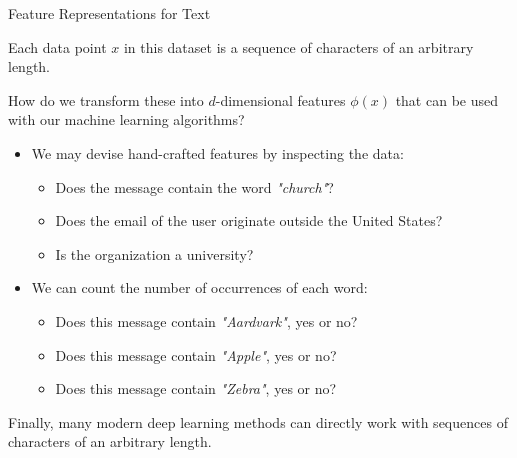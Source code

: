 \documentclass[../../main.tex]{subfiles}
\begin{document}
\begin{frame}[fragile]{Feature Representations for Text}


Each data point $x$ in this dataset is a sequence of characters of an arbitrary length.
\vspace{0.2cm}

How do we transform these into $d$-dimensional features $\phi(x)$ that can be used with our machine learning algorithms?
\vspace{0.2cm}


\begin{itemize}
    \item We may devise hand-crafted features by inspecting the data:
    \begin{itemize}
        \item Does the message contain the word \textit{"church"}?
        \item Does the email of the user originate outside the United States?
        \item Is the organization a university?
    \end{itemize}
    \item We can count the number of occurrences of each word:
    \begin{itemize}
        \item Does this message contain \textit{"Aardvark"}, yes or no?
        \item Does this message contain \textit{"Apple"}, yes or no?
        \item Does this message contain \textit{"Zebra"}, yes or no?
    \end{itemize}
\end{itemize}

Finally, many modern deep learning methods can directly work with sequences of characters of an arbitrary length.


\end{frame}
\end{document}
